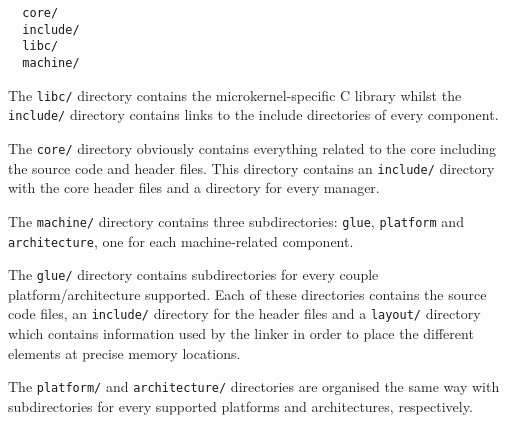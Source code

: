 \begin{verbatim}
  core/
  include/
  libc/
  machine/
\end{verbatim}

The \texttt{libc/} directory contains the microkernel-specific C library
whilst the \texttt{include/} directory contains links to the include
directories of every component.

The \texttt{core/} directory obviously contains everything related to the
core including the source code and header files. This directory contains
an \texttt{include/} directory with the core header files and a directory
for every manager.

The \texttt{machine/} directory contains three subdirectories: \texttt{glue},
\texttt{platform} and \texttt{architecture}, one for each machine-related
component.

The \texttt{glue/} directory contains subdirectories for every couple
platform/architecture supported. Each of these directories contains the
source code files, an \texttt{include/} directory for the header files and
a \texttt{layout/} directory which contains information used by the linker
in order to place the different elements at precise memory locations.

The \texttt{platform/} and \texttt{architecture/} directories are organised
the same way with subdirectories for every supported platforms and
architectures, respectively.
